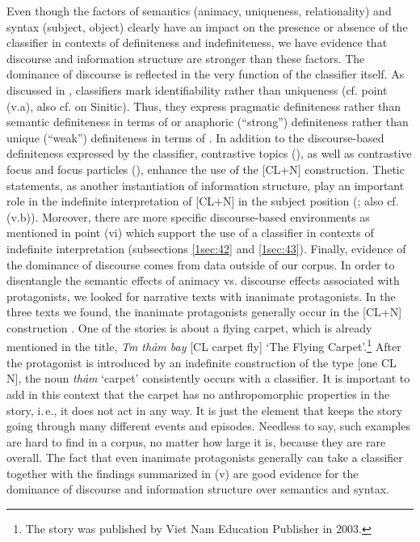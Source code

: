 \documentclass[output=paper]{langsci/langscibook}
\begin{document}
Even though the factors of semantics (animacy, uniqueness, relationality) and syntax (subject, object) clearly have an impact on the presence or absence of the classifier in contexts of definiteness and indefiniteness, we have evidence that discourse and information structure are stronger than these factors. The dominance of discourse is reflected in the very function of the classifier itself. As discussed in , classifiers mark identifiability rather than uniqueness (cf. point (v.a), also cf. \citealt{li:bisang:12} on Sinitic). Thus, they express pragmatic definiteness rather than semantic definiteness in terms of \cite{lobner:85,lobner:11} or anaphoric (``strong'') definiteness rather than unique (``weak'') definiteness in terms of \cite{schwarz:09,schwarz:13}. In addition to the discourse-based definiteness expressed by the classifier, contrastive topics (), as well as contrastive focus and focus particles (), enhance the use of the [CL+N] construction. Thetic statements, as another instantiation of information structure, play an important role in the indefinite interpretation of [CL+N] in the subject position (; also cf. (v.b)). Moreover, there are more specific discourse-based environments as mentioned in point (vi) which support the use of a classifier in contexts of indefinite interpretation (subsections \ref{1sec:42} and \ref{1sec:43}). Finally, evidence of the dominance of discourse comes from data outside of our corpus. In order to disentangle the semantic effects of animacy vs. discourse effects associated with protagonists, we looked for narrative texts with inanimate protagonists. In the three texts we found, the inanimate protagonists generally occur in the [CL+N] construction \citep{quang:forth}. One of the stories is about a flying carpet, which is already mentioned in the title, {\emph{T{\daa}m thảm bay}} [CL carpet fly] `The Flying Carpet'.\footnote{The story was published by Viet Nam Education Publisher in 2003.} After the protagonist is introduced by an indefinite construction of the type [one CL N], the noun {\emph{thảm}} `carpet' consistently occurs with a classifier. It is important to add in this context that the carpet has no anthropomorphic properties in the story, i.\,e., it does not act in any way. It is just the element that keeps the story going through many different events and episodes. Needless to say, such examples are hard to find in a corpus, no matter how large it is, because they are rare overall. The fact that even inanimate protagonists generally can take a classifier together with the findings summarized in (v) are good evidence for the dominance of discourse and information structure over semantics and syntax.
\end{document}
